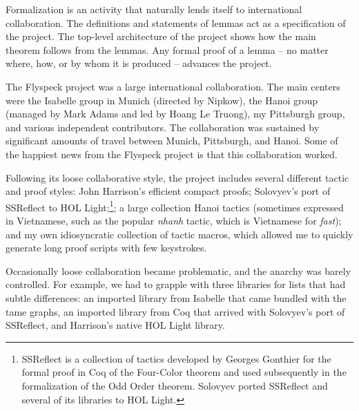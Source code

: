 \documentclass{amsart}
\begin{document}
Formalization is an activity that naturally lends itself to
international collaboration.  The definitions and statements of lemmas
act as a specification of the project.  The top-level architecture of
the project shows how the main theorem follows from the lemmas.  Any
formal proof of a lemma -- no matter where, how, or by whom it is
produced -- advances the project.  


The Flyspeck project was a large international collaboration.  The
main centers were the Isabelle group in Munich (directed by Nipkow),
the Hanoi group (managed by Mark Adams and led by Hoang Le Truong), my
Pittsburgh group, and various independent contributors.  The
collaboration was sustained by significant amounts of travel between
Munich, Pittsburgh, and Hanoi.  Some of the happiest news
from the Flyspeck project is that this collaboration worked.



Following its loose collaborative style, the project includes several
different tactic and proof styles: John Harrison's efficient compact
proofs; Solovyev's port of SSReflect to HOL Light;\footnote{SSReflect
  is a collection of tactics developed by Georges Gonthier for the
  formal proof in Coq of the Four-Color theorem and used subsequently
  in the formalization of the Odd Order theorem. Solovyev ported
  SSReflect and several of its libraries to HOL Light.};
a large
collection Hanoi tactics (sometimes expressed in Vietnamese, such as
the popular \emph{nhanh} tactic, which is Vietnamese for \emph{fast});
and my own idiosyncratic collection of tactic macros, which allowed me
to quickly generate long proof scripts with few keystrokes.

Occasionally loose collaboration became problematic, and the anarchy
was barely controlled.  For example, we had to grapple with three
libraries for lists that had subtle differences: an imported library from
Isabelle that came bundled with the tame graphs, an imported library
from Coq that arrived with Solovyev's port of SSReflect, and
Harrison's native HOL Light library.
\end{document}
